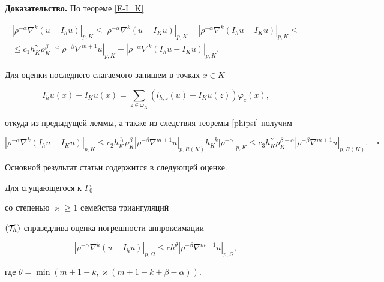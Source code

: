 {\bf Доказательство.} По теореме \ref{E-I_K} 


\begin{multline*}


{|\rho^{-\alpha} \nabla ^k (u-I_hu)|}_{p,K} \le 


{|\rho^{-\alpha} \nabla ^k (u-I_Ku)|}_{p,K} +


{|\rho^{-\alpha} \nabla ^k (I_hu-I_Ku)|}_{p,K} \le \\


%


\le c_1 h_K^\gamma 


\rho_K^{\beta-\alpha}{|\rho^{-\beta}\nabla^{m+1}u|}_{p,K} +


{|\rho^{-\alpha} \nabla ^k (I_hu-I_Ku)|}_{p,K}. 


\end{multline*}


Для оценки последнего слагаемого запишем в точках $x \in K$ 


$$


I_hu(x)-I_Ku(x)=\sum_{z \in \omega_K} (l_{h,z}(u)-I_Ku(z))\varphi_z(x),


$$


откуда из предыдущей леммы, а также из следствия теоремы \ref{phipsi} получим 


$$


{|\rho^{-\alpha} \nabla ^k (I_hu-I_Ku)|}_{p,K} \le c_2 h_K^{\gamma_1} 


\rho_K^\beta{|\rho^{-\beta}\nabla^{m+1}u|}_{p,R(K)}


h_K^{-k}{|\rho^{-\alpha}|}_{p,K} \le 


c_3 h_K^\gamma \rho_K^{\beta-\alpha}


{|\rho^{-\beta}\nabla^{m+1}u|}_{p,R(K)}.\quad\square


$$





Основной результат статьи содержится в следующей оценке. 





\begin{thm}


Для сгущающегося к $\Gamma_0$ 


со степенью $\varkappa \ge 1$ семейства триангуляций 


$({\cal T}_h)$ справедлива оценка погрешности аппроксимации 


$$


{|\rho^{-\alpha}\nabla^k(u-I_hu)|}_{p,\Omega} \le c h^\theta 


{|\rho^{-\beta}\nabla^{m+1}u|}_{p,\Omega},


$$


где $\theta=\min(m+1-k,\varkappa(m+1-k+\beta-\alpha))$.


\end{thm}





